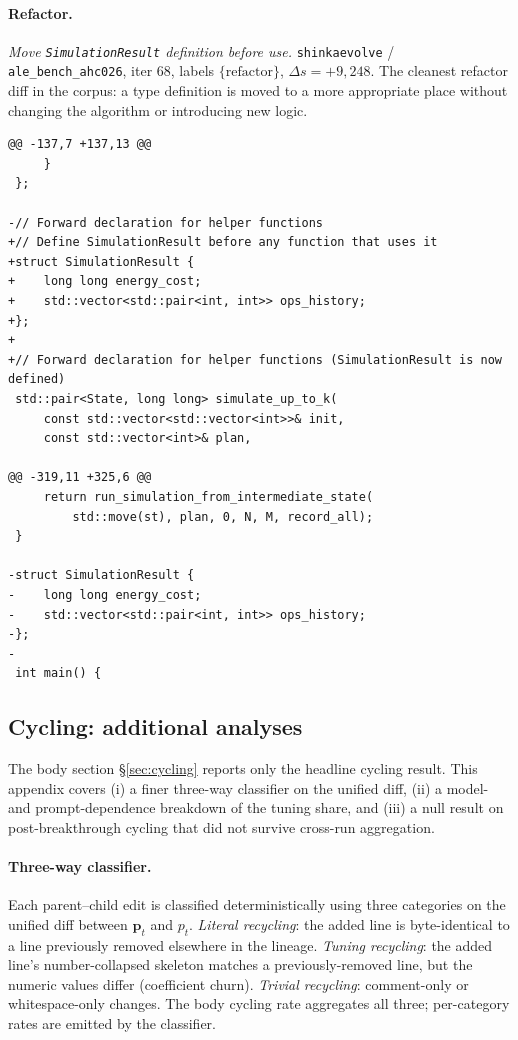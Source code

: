 \paragraph{Refactor.}
\textit{Move \texttt{SimulationResult} definition before use.} \texttt{shinkaevolve} / \texttt{ale\_bench\_ahc026}, iter $68$, labels $\{\text{refactor}\}$, $\Delta s = +9{,}248$. The cleanest refactor diff in the corpus: a type definition is moved to a more appropriate place without changing the algorithm or introducing new logic.
{\scriptsize
\begin{verbatim}
@@ -137,7 +137,13 @@
     }
 };

-// Forward declaration for helper functions
+// Define SimulationResult before any function that uses it
+struct SimulationResult {
+    long long energy_cost;
+    std::vector<std::pair<int, int>> ops_history;
+};
+
+// Forward declaration for helper functions (SimulationResult is now defined)
 std::pair<State, long long> simulate_up_to_k(
     const std::vector<std::vector<int>>& init,
     const std::vector<int>& plan,

@@ -319,11 +325,6 @@
     return run_simulation_from_intermediate_state(
         std::move(st), plan, 0, N, M, record_all);
 }

-struct SimulationResult {
-    long long energy_cost;
-    std::vector<std::pair<int, int>> ops_history;
-};
-
 int main() {
\end{verbatim}
}

\subsection{Cycling: additional analyses}
\label{appendix:cycling-extras}

The body section \S\ref{sec:cycling} reports only the headline cycling result. This appendix covers (i) a finer three-way classifier on the unified diff, (ii) a model- and prompt-dependence breakdown of the tuning share, and (iii) a null result on post-breakthrough cycling that did not survive cross-run aggregation.

\paragraph{Three-way classifier.}
Each parent--child edit is classified deterministically using three categories on the unified diff between $\mathbf{p}_t$ and $p_t$. \emph{Literal recycling}: the added line is byte-identical to a line previously removed elsewhere in the lineage. \emph{Tuning recycling}: the added line's number-collapsed skeleton matches a previously-removed line, but the numeric values differ (coefficient churn). \emph{Trivial recycling}: comment-only or whitespace-only changes. The body cycling rate aggregates all three; per-category rates are emitted by the classifier.

